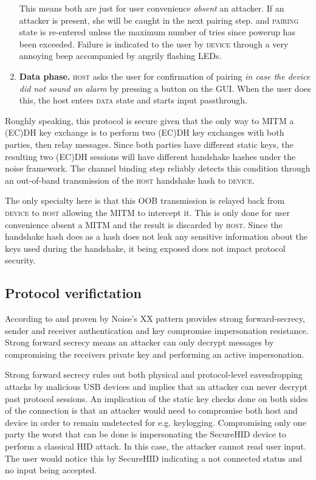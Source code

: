 \documentclass[12pt,a4paper,notitlepage]{article}
\begin{document}
\begin{enumerate}
{        This means both are just for user convenience \emph{absent} an attacker. If an attacker is present, she will be
        caught in the next pairing step.
    } and \textsc{pairing} state is re-entered unless the maximum number of tries since powerup has been exceeded.
    Failure is indicated to the user by \textsc{device} through a very annoying beep accompanied by angrily flashing
    LEDs.
\item \textbf{Data phase.} \textsc{host} asks the user for confirmation of pairing \emph{in case the device did not sound an alarm} by
    pressing a button on the GUI. When the user does this, the host enters \textsc{data} state and starts input
    passthrough.
\end{enumerate}

Roughly speaking, this protocol is secure given that the only way to MITM a (EC)DH key exchange is to perform two (EC)DH
key exchanges with both parties, then relay messages. Since both parties have different static keys, the resulting two
(EC)DH sessions will have different handshake hashes under the noise framework. The channel binding step reliably
detects this condition through an out-of-band transmission of the \textsc{host} handshake hash to \textsc{device}.

The only specialty here is that this OOB transmission is relayed back from \textsc{device} to \textsc{host} allowing the
MITM to intercept it. This is only done for user convenience absent a MITM and the result is discarded by \textsc{host}.
Since the handshake hash does as a hash does not leak any sensitive information about the keys used during the
handshake, it being exposed does not impact protocol security.

\subsection{Protocol verifictation}
According to \textcite{perrin01} and proven by \textcite{kobeissi01} Noise's XX pattern provides strong forward-secrecy,
sender and receiver authentication and key compromise impersonation resistance. Strong forward secrecy means an attacker
can only decrypt messages by compromising the receivers private key and performing an active impersonation.

Strong forward secrecy rules out both physical and protocol-level eavesdropping attacks by malicious USB devices and
implies that an attacker can never decrypt past protocol sessions. An implication of the static key checks done on both
sides of the connection is that an attacker would need to compromise both host and device in order to remain undetected
for e.g. keylogging.  Compromising only one party the worst that can be done is impersonating the SecureHID device to
perform a classical HID attack. In this case, the attacker cannot read user input.  The user would notice this by
SecureHID indicating a not connected status and no input being accepted.
\end{document}
